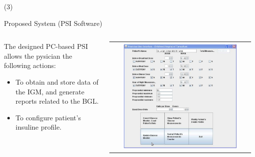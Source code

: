\begin{frame}{ (3)}
\begin{block}{Proposed System (PSI Software)}





\begin{columns}
		\begin{column}{0.48\textwidth}
		The designed PC-based PSI allows the pysician the following actions: 
		\begin{itemize}
		\item To obtain and store data of the IGM, and generate reports related to the BGL.
		\item To configure patient's insuline profile.
		
        \end{itemize}
				\end{column}
				\begin{column}{0.48\textwidth}
\begin{center}
     \begin{tabular}{c}
         \includegraphics[width=0.86\textwidth]{Figs/IntelligentGlucometer4}
          \end{tabular}
\end{center}
		\end{column}
				\end{columns}
\end{block} 
\end{frame}


